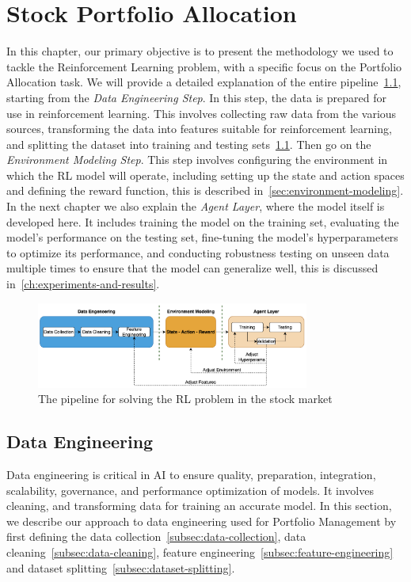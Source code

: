 \documentclass[../xlapes02]{subfiles}
\begin{document}
    \chapter{Stock Portfolio Allocation}\label{ch:stock-portfolio-allocation}
    In this chapter, our primary objective is to present the methodology we used to tackle the Reinforcement Learning problem, with a specific focus on the Portfolio Allocation task. We will provide a detailed explanation of the entire pipeline~\cref{fig:pipeline}, starting from the \emph{Data Engineering Step}. In this step, the data is prepared for use in reinforcement learning. This involves collecting raw data from the various sources, transforming the data into features suitable for reinforcement learning, and splitting the dataset into training and testing sets~\cref{sec:data-engineering}. Then go on the \emph{Environment Modeling Step}. This step involves configuring the environment in which the RL model will operate, including setting up the state and action spaces and defining the reward function, this is described in~\cref{sec:environment-modeling}. In the next chapter we also explain the \emph{Agent Layer}, where the model itself is developed here. It includes training the model on the training set, evaluating the model's performance on the testing set, fine-tuning the model's hyperparameters to optimize its performance, and conducting robustness testing on unseen data multiple times to ensure that the model can generalize well, this is discussed in~\cref{ch:experiments-and-results}.

    \begin{figure}[ht!]
        \centering
        \includegraphics[width=0.8\textwidth]{./image/pipeline}
        \caption{The pipeline for solving the RL problem in the stock market~\cite{liu2022finrlmeta}}
        \label{fig:pipeline}
    \end{figure}


    \section{Data Engineering}\label{sec:data-engineering}
    Data engineering is critical in AI to ensure quality, preparation, integration, scalability, governance, and performance optimization of models. It involves cleaning, and transforming data for training an accurate model. In this section, we describe our approach to data engineering used for Portfolio Management by first defining the data collection~\cref{subsec:data-collection}, data cleaning~\cref{subsec:data-cleaning}, feature engineering~\cref{subsec:feature-engineering} and dataset splitting~\cref{subsec:dataset-splitting}.
\end{document}
